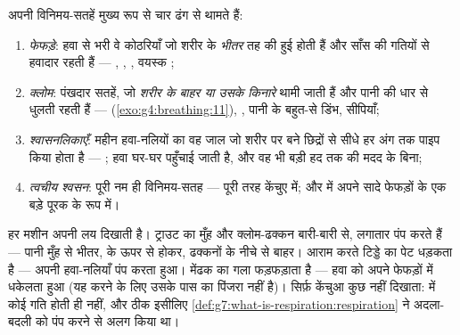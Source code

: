 \begin{definition}[चार मशीनें]\label{def:g7:how-animals-breathe:four}
 अपनी विनिमय-सतहें मुख्य रूप से चार ढंग से थामते हैं:
\begin{enumerate}
  \item \emph{फेफड़े}: हवा से भरी वे कोठरियाँ जो शरीर के
        \emph{भीतर} तह की हुई होती हैं और साँस की गतियों से हवादार
        रहती हैं --- , , , वयस्क ;
  \item \emph{क्लोम}: पंखदार सतहें, जो \emph{शरीर के बाहर
        या उसके किनारे} थामी जाती हैं और पानी की धार से धुलती रहती हैं
        ---  (\cref{exo:g4:breathing:11}), , पानी के
        बहुत-से डिंभ, सीपियाँ;
  \item \emph{श्वासनलिकाएँ}: महीन हवा-नलियों
        का वह जाल जो शरीर पर बने छिद्रों से सीधे हर अंग तक पाइप किया
        होता है --- ; हवा घर-घर पहुँचाई जाती है, और वह भी बड़ी हद तक
         की मदद के बिना;
  \item \emph{त्वचीय श्वसन}: पूरी नम  ही
        विनिमय-सतह --- पूरी तरह केंचुए में; और  में अपने सादे
        फेफड़ों के एक बड़े पूरक के रूप में।
\end{enumerate}
\end{definition}

\begin{example}[मशीनों को चलते देखना]\label{ex:g7:how-animals-breathe:watch}
हर मशीन अपनी लय दिखाती है। ट्राउट का मुँह और क्लोम-ढक्कन बारी-बारी से,
लगातार पंप करते हैं --- पानी मुँह से भीतर,  के ऊपर से होकर,
ढक्कनों के नीचे से बाहर। आराम करते टिड्डे का पेट धड़कता है --- अपनी
हवा-नलियाँ पंप करता हुआ। मेंढक का गला फड़फड़ाता है --- हवा को अपने
फेफड़ों में धकेलता हुआ (यह करने के लिए उसके पास  का पिंजरा नहीं
है)। सिर्फ़ केंचुआ कुछ नहीं दिखाता:  में कोई गति होती ही
नहीं, और ठीक इसीलिए
\cref{def:g7:what-is-respiration:respiration} ने अदला-बदली को पंप करने
से अलग किया था।
\end{example}

